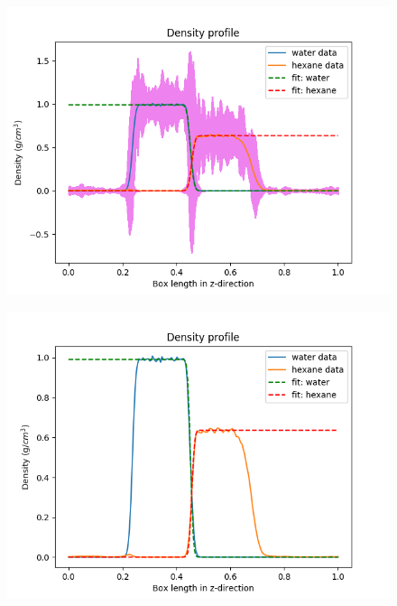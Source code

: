 \documentclass[12pt,reqno]{amsart}
\numberwithin{equation}{section}
\begin{document}
\begin{enumerate}
\begin{figure}[H]
\centering
\includegraphics[scale=0.6]{interface_density_profile_simultaneousfit_NVTequil-32bead-long}
\end{figure}

\begin{figure}[H]
\centering
\includegraphics[scale=0.6]{interface_density_profile_blockfit_NVTequil-32bead-long-noSE}
\end{figure}


\end{enumerate}
\end{document}
